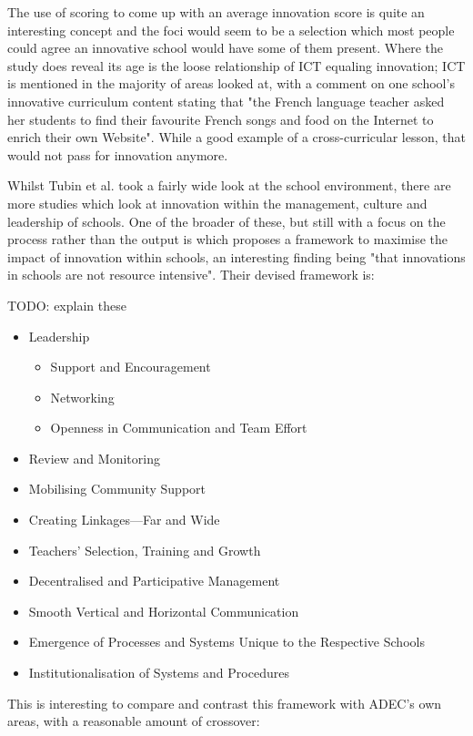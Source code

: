 The use of scoring to come up with an average innovation score is quite an interesting concept and the foci would seem to be a selection which most people could agree an innovative school would have some of them present. Where the study does reveal its age is the loose relationship of ICT equaling innovation; ICT is mentioned in the majority of areas looked at, with a comment on one school's innovative curriculum content stating that "the French language teacher asked her students to find their favourite French songs and food on the Internet to enrich their own Website". While a good example of a cross-curricular lesson, that would not pass for innovation anymore.

Whilst Tubin et al. took a fairly wide look at the school environment, there are more studies which look at innovation within the management, culture and leadership of schools. One of the broader of these, but still with a focus on the process rather than the output is \citet{Sharma_2005} which proposes a framework to maximise the impact of innovation within schools, an interesting finding being "that innovations in schools are not resource intensive". Their devised framework is:

TODO: explain these
\begin{itemize}
\item Leadership
    \begin{itemize}
    \item Support and Encouragement
    \item Networking
    \item Openness in Communication and Team Effort
    \end{itemize}
\item Review and Monitoring
\item Mobilising Community Support
\item Creating Linkages—Far and Wide
\item Teachers’ Selection, Training and Growth
\item Decentralised and Participative Management
\item Smooth Vertical and Horizontal Communication
\item Emergence of Processes and Systems Unique to the Respective Schools
\item Institutionalisation of Systems and Procedures
\end{itemize}

This is interesting to compare and contrast this framework with ADEC's own areas, with a reasonable amount of crossover:

